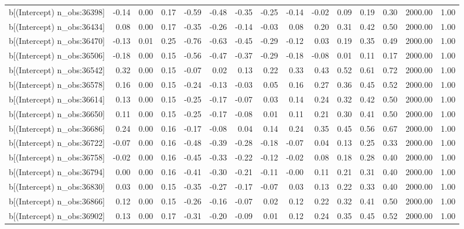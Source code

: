 \begin{table}[ht]
\begin{tabular}{rrrrrrrrrrrrrrr}
  b[(Intercept) n\_obs:36398] & -0.14 & 0.00 & 0.17 & -0.59 & -0.48 & -0.35 & -0.25 & -0.14 & -0.02 & 0.09 & 0.19 & 0.30 & 2000.00 & 1.00 \\ 
  b[(Intercept) n\_obs:36434] & 0.08 & 0.00 & 0.17 & -0.35 & -0.26 & -0.14 & -0.03 & 0.08 & 0.20 & 0.31 & 0.42 & 0.50 & 2000.00 & 1.00 \\ 
  b[(Intercept) n\_obs:36470] & -0.13 & 0.01 & 0.25 & -0.76 & -0.63 & -0.45 & -0.29 & -0.12 & 0.03 & 0.19 & 0.35 & 0.49 & 2000.00 & 1.00 \\ 
  b[(Intercept) n\_obs:36506] & -0.18 & 0.00 & 0.15 & -0.56 & -0.47 & -0.37 & -0.29 & -0.18 & -0.08 & 0.01 & 0.11 & 0.17 & 2000.00 & 1.00 \\ 
  b[(Intercept) n\_obs:36542] & 0.32 & 0.00 & 0.15 & -0.07 & 0.02 & 0.13 & 0.22 & 0.33 & 0.43 & 0.52 & 0.61 & 0.72 & 2000.00 & 1.00 \\ 
  b[(Intercept) n\_obs:36578] & 0.16 & 0.00 & 0.15 & -0.24 & -0.13 & -0.03 & 0.05 & 0.16 & 0.27 & 0.36 & 0.45 & 0.52 & 2000.00 & 1.00 \\ 
  b[(Intercept) n\_obs:36614] & 0.13 & 0.00 & 0.15 & -0.25 & -0.17 & -0.07 & 0.03 & 0.14 & 0.24 & 0.32 & 0.42 & 0.50 & 2000.00 & 1.00 \\ 
  b[(Intercept) n\_obs:36650] & 0.11 & 0.00 & 0.15 & -0.25 & -0.17 & -0.08 & 0.01 & 0.11 & 0.21 & 0.30 & 0.41 & 0.50 & 2000.00 & 1.00 \\ 
  b[(Intercept) n\_obs:36686] & 0.24 & 0.00 & 0.16 & -0.17 & -0.08 & 0.04 & 0.14 & 0.24 & 0.35 & 0.45 & 0.56 & 0.67 & 2000.00 & 1.00 \\ 
  b[(Intercept) n\_obs:36722] & -0.07 & 0.00 & 0.16 & -0.48 & -0.39 & -0.28 & -0.18 & -0.07 & 0.04 & 0.13 & 0.25 & 0.33 & 2000.00 & 1.00 \\ 
  b[(Intercept) n\_obs:36758] & -0.02 & 0.00 & 0.16 & -0.45 & -0.33 & -0.22 & -0.12 & -0.02 & 0.08 & 0.18 & 0.28 & 0.40 & 2000.00 & 1.00 \\ 
  b[(Intercept) n\_obs:36794] & 0.00 & 0.00 & 0.16 & -0.41 & -0.30 & -0.21 & -0.11 & -0.00 & 0.11 & 0.21 & 0.31 & 0.40 & 2000.00 & 1.00 \\ 
  b[(Intercept) n\_obs:36830] & 0.03 & 0.00 & 0.15 & -0.35 & -0.27 & -0.17 & -0.07 & 0.03 & 0.13 & 0.22 & 0.33 & 0.40 & 2000.00 & 1.00 \\ 
  b[(Intercept) n\_obs:36866] & 0.12 & 0.00 & 0.15 & -0.26 & -0.16 & -0.07 & 0.02 & 0.12 & 0.22 & 0.32 & 0.41 & 0.50 & 2000.00 & 1.00 \\ 
  b[(Intercept) n\_obs:36902] & 0.13 & 0.00 & 0.17 & -0.31 & -0.20 & -0.09 & 0.01 & 0.12 & 0.24 & 0.35 & 0.45 & 0.52 & 2000.00 & 1.00 \\ 

\end{tabular}
\end{table}
